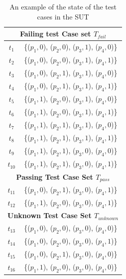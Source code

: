 \begin{table}[htbp]
  \centering
  \caption{An example of the state of the test cases in the SUT}
  \label{ex:determinableschemassut}
    \begin{tabular}{|c|c|} \hline
     \multicolumn{2}{|c|}{\textbf{Failing test Case set $T_{fail}$}} \\ \hline
  $t_{1}$ & \{($p_{1}, 0$), ($p_{2}, 0$), ($p_{3}, 1$), ($p_{4}, 0$)\}\\
  $t_{2}$ & \{($p_{1}, 0$), ($p_{2}, 0$), ($p_{3}, 1$), ($p_{4}, 1$)\}\\
  $t_{3}$ & \{($p_{1}, 0$), ($p_{2}, 1$), ($p_{3}, 1$), ($p_{4}, 0$)\}\\
  $t_{4}$ & \{($p_{1}, 0$), ($p_{2}, 1$), ($p_{3}, 1$), ($p_{4}, 1$)\}\\
  $t_{5}$ & \{($p_{1}, 1$), ($p_{2}, 0$), ($p_{3}, 1$), ($p_{4}, 0$)\}\\
  $t_{6}$ & \{($p_{1}, 1$), ($p_{2}, 0$), ($p_{3}, 1$), ($p_{4}, 1$)\}\\
  $t_{7}$ & \{($p_{1}, 1$), ($p_{2}, 1$), ($p_{3}, 1$), ($p_{4}, 0$)\}\\
  $t_{8}$ & \{($p_{1}, 1$), ($p_{2}, 1$), ($p_{3}, 1$), ($p_{4}, 1$)\}\\

  $t_{9}$ & \{($p_{1}, 1$), ($p_{2}, 1$), ($p_{3}, 0$), ($p_{4}, 0$)\}\\
  $t_{10}$ & \{($p_{1}, 1$), ($p_{2}, 1$), ($p_{3}, 0$), ($p_{4}, 1$)\}\\  \hline

     \multicolumn{2}{|c|}{\textbf{Passing Test Case Set $T_{pass}$}} \\ \hline
  $t_{11}$ & \{($p_{1}, 0$), ($p_{2}, 1$), ($p_{3}, 0$), ($p_{4}, 1$)\} \\
  $t_{12}$ & \{($p_{1}, 1$), ($p_{2}, 0$), ($p_{3}, 0$), ($p_{4}, 1$)\} \\ \hline
        \multicolumn{2}{|c|}{\textbf{Unknown Test Case Set $T_{unknown}$}} \\ \hline
  $t_{13}$ & \{($p_{1}, 0$), ($p_{2}, 0$), ($p_{3}, 0$), ($p_{4}, 0$)\} \\
  $t_{14}$ & \{($p_{1}, 0$), ($p_{2}, 0$), ($p_{3}, 0$), ($p_{4}, 1$)\} \\
  $t_{15}$ & \{($p_{1}, 0$), ($p_{2}, 1$), ($p_{3}, 0$), ($p_{4}, 0$)\} \\
  $t_{16}$ & \{($p_{1}, 1$), ($p_{2}, 0$), ($p_{3}, 0$), ($p_{4}, 0$)\} \\ \hline
    \end{tabular}%
\end{table}


